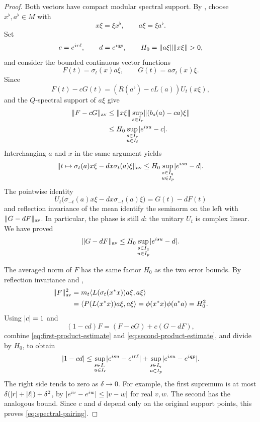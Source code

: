 \begin{proof}
Both vectors have compact modular spectral support. By
, choose $x^\flat,a^\flat\in M$ with
\[
 x\xi=\xi x^\flat,\qquad a\xi=\xi a^\flat.
\]
Set
\[
 c=e^{ir\ell},\qquad d=e^{iqp},\qquad
 H_0=\lVert a\xi\rVert\lVert x\xi\rVert>0,
\]
and consider the bounded continuous vector functions
\[
 F(t)=\sigma_t(x)a\xi,\qquad G(t)=a\sigma_t(x)\xi.
\]
Since
\[
 F(t)-cG(t)=(R(a^\flat)-cL(a))U_t(x\xi),
\]
 and the $Q$-spectral support of $a\xi$ give
\begin{align}
 \lVert F-cG\rVert_{\mathrm{av}}
 &\leq\lVert x\xi\rVert\sup_{s\in I_r}\lVert(b_s(a)-ca)\xi\rVert\notag\\
 &\leq H_0\sup_{\substack{s\in I_r\\u\in I_\ell}}
                \lvert e^{isu}-c\rvert.
 \label{eq:first-product-estimate}
\end{align}
Interchanging $a$ and $x$ in the same argument yields
\[
 \lVert t\mapsto\sigma_t(a)x\xi-dx\sigma_t(a)\xi\rVert_{\mathrm{av}}
 \leq H_0\sup_{\substack{s\in I_q\\u\in I_p}}\lvert e^{isu}-d\rvert.
\]
The pointwise identity
\begin{equation}
 U_t\bigl(\sigma_{-t}(a)x\xi-dx\sigma_{-t}(a)\xi\bigr)
       =G(t)-dF(t)
 \label{eq:time-reversal}
\end{equation}
and reflection invariance of the mean identify the seminorm on the left
with $\lVert G-dF\rVert_{\mathrm{av}}$. In particular, the phase is still $d$:
the unitary $U_t$ is complex linear. We have proved
\begin{equation}
 \lVert G-dF\rVert_{\mathrm{av}}
 \leq H_0\sup_{\substack{s\in I_q\\u\in I_p}}\lvert e^{isu}-d\rvert.
 \label{eq:second-product-estimate}
\end{equation}

The averaged norm of $F$ has the same factor $H_0$ as the two error bounds.
By reflection invariance and
,
\begin{align}
 \lVert F\rVert_{\mathrm{av}}^2
 &=m_t\langle L(\sigma_t(x^*x))a\xi,a\xi\rangle\notag\\
 &=\langle P(L(x^*x))a\xi,a\xi\rangle
   =\phi(x^*x)\phi(a^*a)=H_0^2.
 \label{eq:product-norm}
\end{align}
Using $\lvert c\rvert=1$ and
\[
 (1-cd)F=(F-cG)+c(G-dF),
\]
combine \eqref{eq:first-product-estimate} and
\eqref{eq:second-product-estimate}, and divide by $H_0$, to obtain
\[
 \lvert1-cd\rvert
 \leq
 \sup_{\substack{s\in I_r\\u\in I_\ell}}\lvert e^{isu}-e^{ir\ell}\rvert
 +\sup_{\substack{s\in I_q\\u\in I_p}}\lvert e^{isu}-e^{iqp}\rvert.
\]
The right side tends to zero as $\delta\to0$. For example, the first
supremum is at most $\delta(\lvert r\rvert+\lvert\ell\rvert)+\delta^2$, by
$\lvert e^{iv}-e^{iw}\rvert\leq\lvert v-w\rvert$ for real $v,w$. The second has the
analogous bound. Since $c$ and $d$ depend only on the original support
points, this proves \eqref{eq:spectral-pairing}.
\end{proof}

